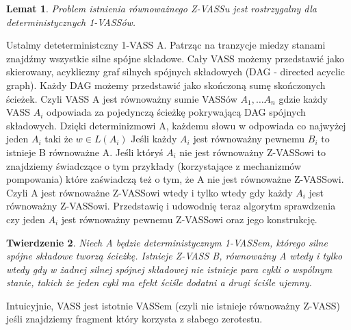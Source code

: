 \documentclass[magisterska]{pracamgr}
\newtheorem{theorem}{Twierdzenie}[section]
\newtheorem{lemma}[theorem]{Lemat}
\begin{document}
    \begin{lemma}
        \label{1-dim-det-vass}
        Problem istnienia równoważnego Z-VASSu jest rostrzygalny dla deterministycznych 1-VASSów.
    \end{lemma}
    Ustalmy deteterministczny 1-VASS A.
    Patrząc na tranzycje miedzy stanami znajdźmy wszystkie silne spójne składowe.
    Cały VASS możemy przedstawić jako skierowany, acykliczny graf silnych spójnych składowych (DAG - directed acyclic graph).
    Każdy DAG możemy przedstawić jako skończoną sumę skończonych ścieżek.
    Czyli VASS A jest równoważny sumie VASSów $A_1, \dots A_n$ gdzie każdy VASS $A_i$ odpowiada za pojedynczą ścieżkę pokrywającą DAG spójnych składowych.
    Dzięki determinizmowi A, każdemu słowu w odpowiada co najwyżej jeden $A_i$ taki że $w \in L(A_i)$
    Jeśli każdy $A_i$ jest równoważny pewnemu $B_i$ to istnieje B równoważne A.
    Jeśli któryś $A_i$ nie jest równoważny Z-VASSowi to znajdziemy świadczące o tym przykłady (korzystające z mechanizmów pompowania) które
    zaświadczą też o tym, że A nie jest równoważne Z-VASSowi.
    Czyli A jest równoważne Z-VASSowi wtedy i tylko wtedy gdy każdy $A_i$ jest równoważny Z-VASSowi.
    Przedstawię i udowodnię teraz algorytm sprawdzenia czy jeden $A_i$ jest równoważny pewnemu Z-VASSowi oraz jego konstrukcję.
    \begin{theorem}
        \label{algorytm_na_zvass_1dim}
        Niech A będzie deterministycznym 1-VASSem, którego silne spójne składowe tworzą ścieżkę.
        Istnieje Z-VASS B, równoważny A wtedy i tylko wtedy gdy w żadnej silnej spójnej składowej nie istnieje para cykli o wspólnym stanie,
        takich że jeden cykl ma efekt ściśle dodatni a drugi ściśle ujemny.
    \end{theorem}
    Intuicyjnie, VASS jest istotnie VASSem (czyli nie istnieje równoważny Z-VASS) jeśli znajdziemy fragment który korzysta z słabego zerotestu.
\end{document}
